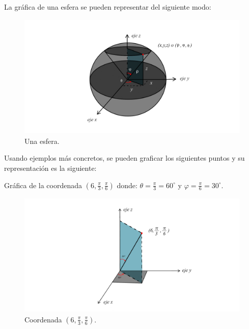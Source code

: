 La gráfica de una esfera se pueden representar del siguiente modo:

\begin{figure}[H]
  \centering
  \includegraphics[width=11.17cm, height=5.97cm]{img/graph/sfera.jpg}
  \caption{Una esfera.}
\end{figure}


Usando ejemplos más concretos, se pueden graficar los siguientes puntos y su representación es la siguiente:

\vspace{4mm}
Gráfica de la coordenada ${\left( 6,\frac{\pi}{3},\frac{\pi}{6} \right)}$ donde: ${\theta = \frac{\pi}{3} = 60^{\circ} }$ y ${ \varphi = \frac{\pi}{6} = 30^{\circ}}$.
\begin{figure}[H]
  \centering
  \includegraphics[width=11.17cm, height=5.97cm]{img/graph/grafica_1.jpg}
  \caption{Coordenada ${\left( 6,\frac{\pi}{3},\frac{\pi}{6} \right)}$.}
\end{figure}

